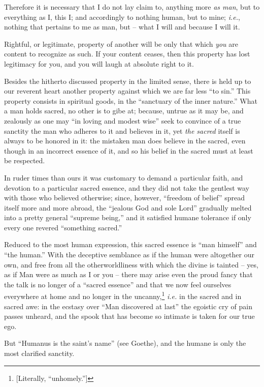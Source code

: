 Therefore it is necessary that I do not lay claim to, anything more \textit{as 
man}, but to everything as I, this I; and accordingly to nothing human, but to 
mine; \textit{i.e.}, nothing that pertains to me as man, but -- what I will 
and because I will it.

Rightful, or legitimate, property of another will be only that which 
\textit{you} are content to recognize as such. If your content ceases, then 
this property has lost legitimacy for you, and you will laugh at absolute 
right to it.

Besides the hitherto discussed property in the limited sense, there is held up 
to our reverent heart another property against which we are far less ``to 
sin.'' This property consists in spiritual goods, in the ``sanctuary of the 
inner nature.'' What a man holds sacred, no other is to gibe at; because, 
untrue as it may be, and zealously as one may ``in loving and modest wise'' 
seek to convince of a true sanctity the man who adheres to it and believes in 
it, yet \textit{the sacred} itself is always to be honored in it: the mistaken 
man does believe in the sacred, even though in an incorrect essence of it, and 
so his belief in the sacred must at least be respected.

In ruder times than ours it was customary to demand a particular faith, and 
devotion to a particular sacred essence, and they did not take the gentlest 
way with those who believed otherwise; since, however, ``freedom of belief'' 
spread itself more and more abroad, the ``jealous God and sole Lord'' 
gradually melted into a pretty general ``supreme being,'' and it satisfied 
humane tolerance if only every one revered ``something sacred.''

Reduced to the most human expression, this sacred essence is ``man himself'' 
and ``the human.'' With the deceptive semblance as if the human were 
altogether our own, and free from all the otherworldliness with which the 
divine is tainted -- yes, as if Man were as much as I or you -- there may 
arise even the proud fancy that the talk is no longer of a ``sacred 
essence'' and that we now feel ourselves everywhere at home and no longer in 
the uncanny,\footnote{[Literally, ``unhomely.'']} \textit{i.e.} in the 
sacred and in sacred awe: in the ecstasy over ``Man discovered at last'' the 
egoistic cry of pain passes unheard, and the spook that has become so intimate 
is taken for our true ego.

But ``Humanus is the saint's name'' (see Goethe), and the humane is only the 
most clarified sanctity.

